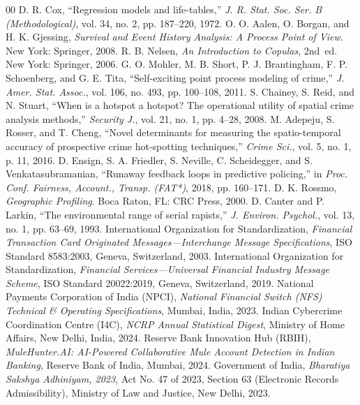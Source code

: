 \documentclass[conference]{IEEEtran}
\begin{document}
\begin{thebibliography}{00}
 D. R. Cox, ``Regression models and life-tables,'' \textit{J. R. Stat. Soc. Ser. B (Methodological)}, vol. 34, no. 2, pp. 187--220, 1972.
 O. O. Aalen, O. Borgan, and H. K. Gjessing, \textit{Survival and Event History Analysis: A Process Point of View}. New York: Springer, 2008.
 R. B. Nelsen, \textit{An Introduction to Copulas}, 2nd~ed. New York: Springer, 2006.
 G. O. Mohler, M. B. Short, P. J. Brantingham, F. P. Schoenberg, and G. E. Tita, ``Self-exciting point process modeling of crime,'' \textit{J. Amer. Stat. Assoc.}, vol. 106, no. 493, pp. 100--108, 2011.
 S. Chainey, S. Reid, and N. Stuart, ``When is a hotspot a hotspot? The operational utility of spatial crime analysis methods,'' \textit{Security J.}, vol. 21, no. 1, pp. 4--28, 2008.
 M. Adepeju, S. Rosser, and T. Cheng, ``Novel determinants for measuring the spatio-temporal accuracy of prospective crime hot-spotting techniques,'' \textit{Crime Sci.}, vol. 5, no. 1, p. 11, 2016.
 D. Ensign, S. A. Friedler, S. Neville, C. Scheidegger, and S. Venkatasubramanian, ``Runaway feedback loops in predictive policing,'' in \textit{Proc. Conf. Fairness, Account., Transp. (FAT*)}, 2018, pp. 160--171.
 D. K. Rossmo, \textit{Geographic Profiling}. Boca Raton, FL: CRC Press, 2000.
 D. Canter and P. Larkin, ``The environmental range of serial rapists,'' \textit{J. Environ. Psychol.}, vol. 13, no. 1, pp. 63--69, 1993.
 International Organization for Standardization, \textit{Financial Transaction Card Originated Messages---Interchange Message Specifications}, ISO Standard 8583:2003, Geneva, Switzerland, 2003.
 International Organization for Standardization, \textit{Financial Services---Universal Financial Industry Message Scheme}, ISO Standard 20022:2019, Geneva, Switzerland, 2019.
 National Payments Corporation of India (NPCI), \textit{National Financial Switch (NFS) Technical \& Operating Specifications}, Mumbai, India, 2023.
 Indian Cybercrime Coordination Centre (I4C), \textit{NCRP Annual Statistical Digest}, Ministry of Home Affairs, New Delhi, India, 2024.
 Reserve Bank Innovation Hub (RBIH), \textit{MuleHunter.AI: AI-Powered Collaborative Mule Account Detection in Indian Banking}, Reserve Bank of India, Mumbai, 2024.
 Government of India, \textit{Bharatiya Sakshya Adhiniyam, 2023}, Act No. 47 of 2023, Section 63 (Electronic Records Admissibility), Ministry of Law and Justice, New Delhi, 2023.
\end{thebibliography}
\end{document}
